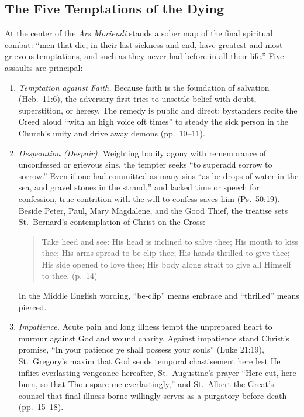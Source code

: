 \subsection{The Five Temptations of the Dying}

At the center of the \emph{Ars Moriendi} stands a sober map of the final spiritual combat: ``men that die, in their last sickness and end, have greatest and most grievous temptations, and such as they never had before in all their life.'' Five assaults are principal:

\begin{enumerate}
\item \emph{Temptation against Faith.} Because faith is the foundation of salvation (Heb.\ 11:6), the adversary first tries to unsettle belief with doubt, superstition, or heresy. The remedy is public and direct: bystanders recite the Creed aloud ``with an high voice oft times'' to steady the sick person in the Church's unity and drive away demons (pp.\ 10--11).

\item \emph{Desperation (Despair).} Weighting bodily agony with remembrance of unconfessed or grievous sins, the tempter seeks ``to superadd sorrow to sorrow.'' Even if one had committed as many sins ``as be drops of water in the sea, and gravel stones in the strand,'' and lacked time or speech for confession, true contrition with the will to confess saves him (Ps.\ 50:19). Beside Peter, Paul, Mary Magdalene, and the Good Thief, the treatise sets St.\ Bernard's contemplation of Christ on the Cross:

\begin{quote}
Take heed and see: His head is inclined to salve thee; His mouth to kiss thee; His arms spread to be-clip thee; His hands thrilled to give thee; His side opened to love thee; His body along strait to give all Himself to thee. (p.\ 14)
\end{quote}

In the Middle English wording, ``be-clip'' means embrace and ``thrilled'' means pierced.

\item \emph{Impatience.} Acute pain and long illness tempt the unprepared heart to murmur against God and wound charity. Against impatience stand Christ's promise, ``In your patience ye shall possess your souls'' (Luke 21:19), St.\ Gregory's maxim that God sends temporal chastisement here lest He inflict everlasting vengeance hereafter, St.\ Augustine's prayer ``Here cut, here burn, so that Thou spare me everlastingly,'' and St.\ Albert the Great's counsel that final illness borne willingly serves as a purgatory before death (pp.\ 15--18).


\end{enumerate}
